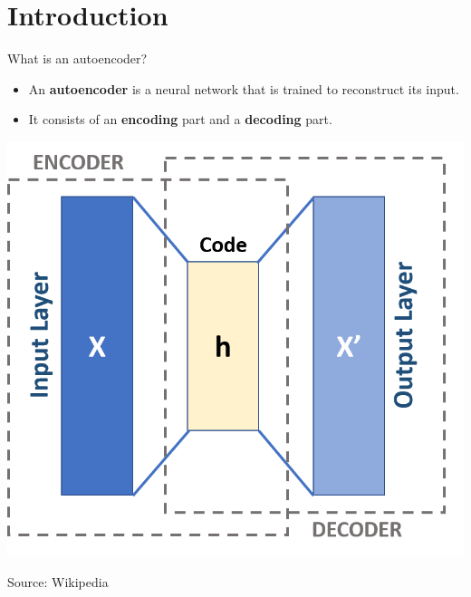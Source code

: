 \documentclass[9pt, aspectratio=169]{beamer}
\begin{document}
\begin{frame}
\begin{columns}
\begin{column}{0.2\textwidth}
        \end{column}
    \end{columns}
\end{frame}

\section{Introduction}

\begin{frame}
    {What is an autoencoder?}

    \begin{itemize}
        \item An \textbf{autoencoder} is a neural network that is trained to reconstruct its input.
        \item It consists of an \textbf{encoding} part and a \textbf{decoding} part.
    \end{itemize}

    {
        \centering
        \includegraphics[width=.35\textwidth]{Autoencoder_schema.png}

        \footnotesize
        Source: Wikipedia
    }

\end{frame}
\end{document}
